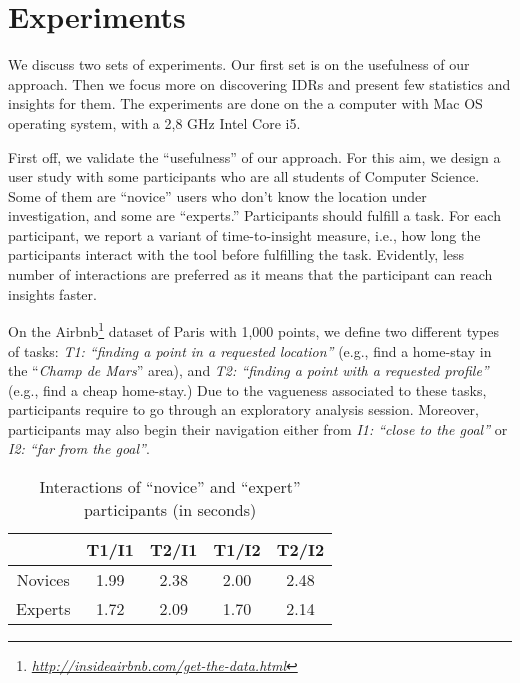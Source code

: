 \documentclass[sigconf,edbt]{acmart-edbt2019}
\begin{document}
\section{Experiments}
\label{sec:experiments}

We discuss two sets of experiments. Our first set is on the usefulness of our approach. Then we focus more on discovering IDRs and present few statistics and insights for them. The experiments are done on the a computer with Mac OS operating system, with a 2,8 GHz Intel Core i5. 


\vspace{2pt}
First off, we validate the ``usefulness'' of our approach. For this aim, we design a user study with some participants who are all students of Computer Science. Some of them are ``novice'' users who don't know the location under investigation, and some are ``experts.'' Participants should fulfill a task. For each participant, we report a variant of time-to-insight measure, i.e., how long the participants interact with the tool before fulfilling the task. Evidently, less number of interactions are preferred as it means that the participant can reach insights faster.

\vspace{2pt}
On the \textsf{Airbnb}\footnote{\it \url{http://insideairbnb.com/get-the-data.html}} dataset of Paris with 1,000 points, we define two different types of tasks: {\em T1: ``finding a point in a requested location''} (e.g., find a home-stay in the ``\textit{Champ de Mars}'' area), and {\em T2: ``finding a point with a requested profile''} (e.g., find a cheap home-stay.) Due to the vagueness associated to these tasks, participants require to go through an exploratory analysis session. Moreover, participants may also begin their navigation either from {\em I1: ``close to the goal''} or {\em I2: ``far from the goal''}. 


\begin{table}[t]
\centering
\caption{Interactions of ``novice'' and ``expert'' participants (in seconds)}
\label{tbl:novice}
\begin{tabular}{c|c|c|c|c|}
\cline{2-5}
                                       	& \textbf{T1/I1} 	& \textbf{T2/I1} 	& \textbf{T1/I2}	& \textbf{T2/I2}	\\ \hline
\multicolumn{1}{|c|}{Novices} 				& 1.99            	& 2.38	          	& 2.00              & 2.48              \\ \hline
\multicolumn{1}{|c|}{Experts} 				& 1.72            	& 2.09	          	& 1.70              & 2.14              \\ \hline
\end{tabular}
\end{table}
\end{document}
